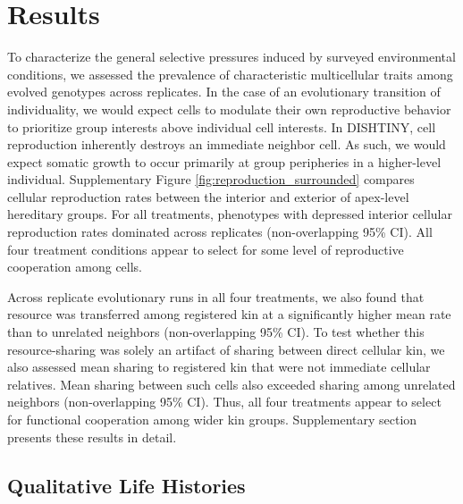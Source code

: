 \section{Results}

To characterize the general selective pressures induced by surveyed environmental conditions, we assessed the prevalence of characteristic multicellular traits among evolved genotypes across replicates.
In the case of an evolutionary transition of individuality, we would expect cells to modulate their own reproductive behavior to prioritize group interests above individual cell interests.
In DISHTINY, cell reproduction inherently destroys an immediate neighbor cell.
As such, we would expect somatic growth to occur primarily at group peripheries in a higher-level individual.
Supplementary Figure \ref{fig:reproduction_surrounded} compares cellular reproduction rates between the interior and exterior of apex-level hereditary groups.
For all treatments, phenotypes with depressed interior cellular reproduction rates dominated across replicates (non-overlapping 95\% CI).
All four treatment conditions appear to select for some level of reproductive cooperation among cells.

Across replicate evolutionary runs in all four treatments, we also found that resource was transferred among registered kin at a significantly higher mean rate than to unrelated neighbors (non-overlapping 95\% CI).
To test whether this resource-sharing was solely an artifact of sharing between direct cellular kin, we also assessed mean sharing to registered kin that were not immediate cellular relatives.
Mean sharing between such cells also exceeded sharing among unrelated neighbors (non-overlapping 95\% CI).
Thus, all four treatments appear to select for functional cooperation among wider kin groups.
Supplementary section \label{sec:resource-sharing} presents these results in detail.

\subsection{Qualitative Life Histories} \label{sec:life-histories}



